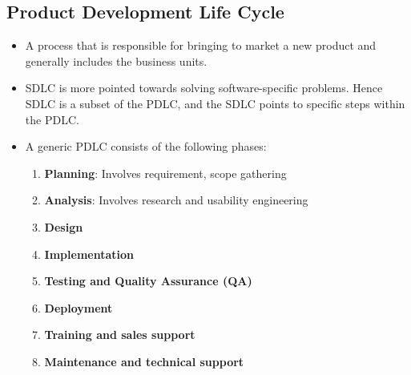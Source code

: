 \documentclass{article}
\begin{document}
\subsection{Product Development Life Cycle}
\begin{itemize}
    \item A process that is responsible for bringing to market a new product and generally includes the business units.
    
    \item SDLC is more pointed towards solving software-specific problems. Hence SDLC is a subset of the PDLC, and the SDLC points to specific steps within the PDLC.
    
    \item A generic PDLC consists of the following phases:
    \begin{enumerate}
        \item \textbf{Planning}: Involves requirement, scope gathering 
        
        \item \textbf{Analysis}: Involves research and usability engineering
        
        \item \textbf{Design}
        
        \item \textbf{Implementation}
        
        \item \textbf{Testing and Quality Assurance (QA)}
        
        \item \textbf{Deployment }
        
        \item \textbf{Training and sales support}
        
        \item \textbf{Maintenance and technical support}
    \end{enumerate}
\end{itemize}
\end{document}
